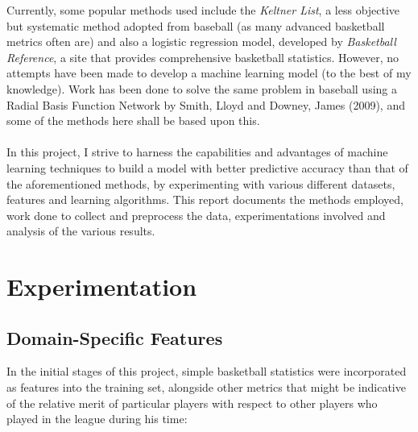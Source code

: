 \documentclass[paper=a4, fontsize=11pt]{scrartcl} %
\numberwithin{equation}{section} %
\numberwithin{figure}{section} %
\numberwithin{table}{section} %
\begin{document}
Currently, some popular methods used include the \textit{Keltner List}, a less objective but systematic method adopted from baseball (as many advanced basketball metrics often are) and also a logistic regression model\cite{logregress}, developed by \textit{Basketball Reference}, a site that provides comprehensive basketball statistics. However, no attempts have been made to develop a machine learning model (to the best of my knowledge). Work has been done to solve the same problem in baseball using a Radial Basis Function Network by Smith, Lloyd and Downey, James (2009)\cite{lloyd}, and some of the methods here shall be based upon this.\\
\\
In this project, I strive to harness the capabilities and advantages of machine learning techniques to build a model with better predictive accuracy than that of the aforementioned methods, by experimenting with various different datasets, features and learning algorithms. This report documents the methods employed, work done to collect and preprocess the data, experimentations involved and analysis of the various results.


\section{Experimentation}

\subsection{Domain-Specific Features}

In the initial stages of this project, simple basketball statistics were incorporated as features into the training set, alongside other metrics that might be indicative of the relative merit of particular players with respect to other players who played in the league during his time: 
\end{document}
